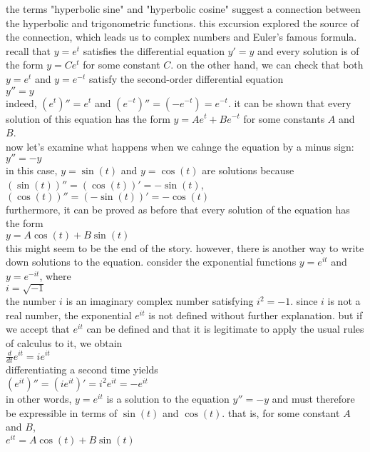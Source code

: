 \documentclass{article}
\begin{document}
the terms "hyperbolic sine" and "hyperbolic cosine" suggest a connection between the hyperbolic and trigonometric functions. this excursion explored the source of the connection, which leads us to complex numbers and Euler's famous formula.\\ recall that $y = e^t$ satisfies the differential equation $y' = y$ and every solution is of the form $y = Ce^t$ for some constant $C$. on the other hand, we can check that both $y = e^t$ and $y = e^{-t}$ satisfy the second-order differential equation\\ $y'' = y$\\ indeed, $(e^t)'' = e^t$ and $(e^{-t})'' = (-e^{-t}) = e^{-t}$. it can be shown that every solution of this equation has the form $y = Ae^t + Be^{-t}$ for some constants $A$ and $B$.\\ now let's examine what happens when we cahnge the equation by a minus sign:\\ $y'' = -y$\\ in this case, $y = \sin(t)$ and $y = \cos(t)$ are solutions because\\ $(\sin(t))'' = (\cos(t))' = -\sin(t)$, $(\cos(t))'' = (-\sin(t))' = -\cos(t)$\\ furthermore, it can be proved as before that every solution of the equation has the form\\ $y = A\cos(t) + B\sin(t)$\\ this might seem to be the end of the story. however, there is another way to write down solutions to the equation. consider the exponential functions $y = e^{it}$ and $y = e^{-it}$, where\\ $i = \sqrt{-1}$\\ the number $i$ is an imaginary complex number satisfying $i^2 = -1$. since $i$ is not a real number, the exponential $e^{it}$ is not defined without further explanation. but if we accept that $e^{it}$ can be defined and that it is legitimate to apply the usual rules of calculus to it, we obtain\\
$\frac{d}{dt}e^{it} = ie^{it}$\\
differentiating a second time yields\\
$(e^{it})'' = (ie^{it})' = i^2e^{it} = -e^{it}$\\
in other words, $y = e^{it}$ is a solution to the equation $y'' = -y$ and must therefore be expressible in terms of $\sin(t)$ and $\cos(t)$. that is, for some constant $A$ and $B$,\\
$e^{it} = A\cos(t) + B\sin(t)$\\
\end{document}
